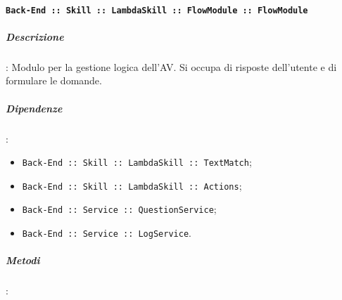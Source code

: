 \documentclass[../DefinizioneDiProdotto_v2.0.0.tex]{subfiles}
\begin{document}
\paragraph{\texttt{Back-End :: Skill :: LambdaSkill :: FlowModule :: FlowModule}}
\subparagraph{Descrizione}: Modulo per la gestione logica dell'AV. Si occupa di risposte dell'utente e di formulare le domande.
\subparagraph{Dipendenze}:
\begin{itemize}
	\item \texttt{Back-End :: Skill :: LambdaSkill :: TextMatch};
	\item \texttt{Back-End :: Skill :: LambdaSkill :: Actions};
	\item \texttt{Back-End :: Service :: QuestionService};
	\item \texttt{Back-End :: Service :: LogService}.
\end{itemize}
\subparagraph{Metodi}:
\end{document}
